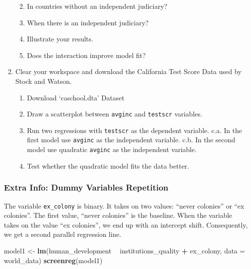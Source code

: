 \documentclass[]{article}
\newenvironment{Shaded}{\begin{snugshade}}{\end{snugshade}}
\newcommand{\KeywordTok}[1]{\textcolor[rgb]{0.13,0.29,0.53}{\textbf{#1}}}
\newcommand{\DataTypeTok}[1]{\textcolor[rgb]{0.13,0.29,0.53}{#1}}
\newcommand{\StringTok}[1]{\textcolor[rgb]{0.31,0.60,0.02}{#1}}
\newcommand{\OperatorTok}[1]{\textcolor[rgb]{0.81,0.36,0.00}{\textbf{#1}}}
\newcommand{\NormalTok}[1]{#1}
\providecommand{\tightlist}{%
  \setlength{\itemsep}{0pt}\setlength{\parskip}{0pt}}
\theoremstyle{definition}
\theoremstyle{definition}
\theoremstyle{definition}
\theoremstyle{remark}
\begin{document}
\begin{enumerate}
  \begin{enumerate}
  \def\labelenumii{\alph{enumii}.}
  \tightlist
  \item
    In countries without an independent judiciary?
  \item
    When there is an independent judiciary?
  \item
    Illustrate your results.
  \item
    Does the interaction improve model fit?
  \end{enumerate}
\item
  Clear your workspace and download the California Test Score Data used
  by Stock and Watson.

  \begin{enumerate}
  \def\labelenumii{\alph{enumii}.}
  \tightlist
  \item
    Download `caschool.dta' Dataset
  \item
    Draw a scatterplot between \texttt{avginc} and \texttt{testscr}
    variables.
  \item
    Run two regressions with \texttt{testscr} as the dependent variable.
    c.a. In the first model use \texttt{avginc} as the independent
    variable. c.b. In the second model use quadratic \texttt{avginc} as
    the independent variable.
  \item
    Test whether the quadratic model fits the data better.
  \end{enumerate}
\end{enumerate}

\subsubsection{Extra Info: Dummy Variables
Repetition}\label{extra-info-dummy-variables-repetition}

The variable \texttt{ex\_colony} is binary. It takes on two values:
``never colonies'' or ``ex colonies''. The first value, ``never
colonies'' is the baseline. When the variable takes on the value ``ex
colonies'', we end up with an intercept shift. Consequently, we get a
second parallel regression line.

\begin{Shaded}
\begin{Highlighting}[]
\NormalTok{model1 <-}\StringTok{ }\KeywordTok{lm}\NormalTok{(human_development }\OperatorTok{~}\StringTok{ }\NormalTok{institutions_quality }\OperatorTok{+}\StringTok{ }\NormalTok{ex_colony, }\DataTypeTok{data =}\NormalTok{ world_data)}
\KeywordTok{screenreg}\NormalTok{(model1)}
\end{Highlighting}
\end{Shaded}
\end{document}
